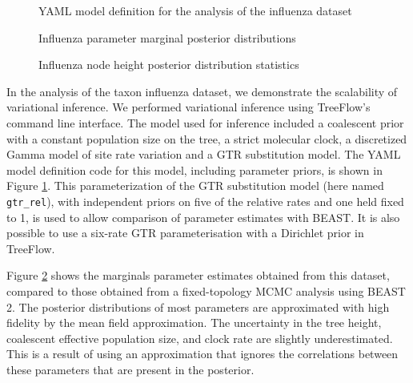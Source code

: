 \begin{figure}

    \inputminted{yaml}{\VAR{ flu_yaml_file }}

    \label{fig:fluyaml}
    \caption{YAML model definition for the analysis of the influenza dataset}
\end{figure}

\begin{figure}
    \centering
    \caption{Influenza parameter marginal posterior distributions}
    \label{fig:flumarginals}
\end{figure}

\begin{figure}
    \centering
    \caption{Influenza node height posterior distribution statistics}
    \label{fig:flutree}
\end{figure}



In the analysis of the  taxon influenza dataset, we demonstrate the scalability of variational inference. We performed variational inference using TreeFlow's command line interface. The model used for inference included a coalescent prior with a constant population size on the tree, a strict molecular clock, a discretized Gamma model of site rate variation and a GTR substitution model. The YAML model definition code for this model, including parameter priors, is shown in Figure \ref{fig:fluyaml}. This parameterization of the GTR substitution model (here named \texttt{gtr\_rel}), with independent priors on five of the relative rates and one held fixed to 1, is used to allow comparison of parameter estimates with BEAST. It is also possible to use a six-rate GTR parameterisation with a Dirichlet prior in TreeFlow.

Figure \ref{fig:flumarginals} shows the marginals parameter estimates obtained from this dataset, compared to those obtained from a fixed-topology MCMC analysis using BEAST 2. The posterior distributions of most parameters are approximated with high fidelity by the mean field approximation. The uncertainty in the tree height, coalescent effective population size, and clock rate are slightly underestimated. This is a result of using an approximation that ignores the correlations between these parameters that are present in the posterior.

